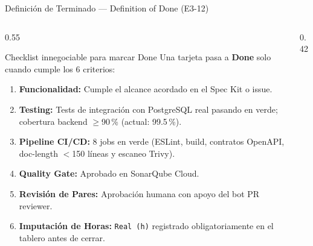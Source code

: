 
\begin{frame}{Definición de Terminado — Definition of Done (E3-12)}
\begin{columns}[T,onlytextwidth]
\begin{column}{0.55\textwidth}
\begin{block}{Checklist innegociable para marcar Done}
\scriptsize
Una tarjeta pasa a \textbf{Done} solo cuando cumple los 6 criterios:
\begin{enumerate}
  \item \textbf{Funcionalidad:} Cumple el alcance acordado en el Spec Kit o issue.
  \item \textbf{Testing:} Tests de integración con PostgreSQL real pasando en verde; cobertura backend $\ge$90\,\% (actual: 99.5\,\%).
  \item \textbf{Pipeline CI/CD:} 8 jobs en verde (ESLint, build, contratos OpenAPI, doc-length $<$150 líneas y escaneo Trivy).
  \item \textbf{Quality Gate:} Aprobado en SonarQube Cloud.
  \item \textbf{Revisión de Pares:} Aprobación humana con apoyo del bot PR reviewer.
  \item \textbf{Imputación de Horas:} \texttt{Real (h)} registrado obligatoriamente en el tablero antes de cerrar.
\end{enumerate}
\end{block}
\end{column}
\begin{column}{0.42\textwidth}
\centering
{}
\end{column}
\end{columns}
\end{frame}

